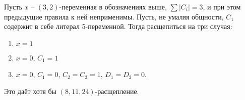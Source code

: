 \begin{brule}
 Пусть $x$ -- $(3,2)$-переменная в обозначениях выше, $\sum |C_i| = 3$, и при этом предыдущие правила к ней неприменимы. Пусть, не умаляя общности, $C_1$ содержит в себе литерал 5-переменной. Тогда расщепиться на три случая:

 \begin{enumerate}
  \item $x = 1$
  \item $x = 0$, $C_1 = 1$
  \item $x = 0$, $C_1 = 0$, $C_2 = C_3 = 1$, $D_1 = D_2 = 0$.
 \end{enumerate}

 Это даёт хотя бы $(8,11,24)$-расщепление.
 \label{brule:n5:32-rest:c3:3-cases}
\end{brule}

